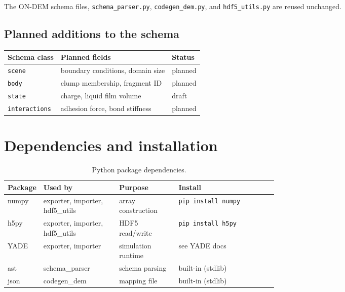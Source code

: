 \documentclass[11pt,a4paper]{article}
\begin{document}
The ON-DEM schema files, \texttt{schema\_parser.py}, \texttt{codegen\_dem.py},
and \texttt{hdf5\_utils.py} are reused unchanged.

\subsection{Planned additions to the schema}

\begin{center}
\begin{tabular}{lll}
\toprule
\sffamily\textbf{Schema class} & \sffamily\textbf{Planned fields} & \sffamily\textbf{Status} \\
\midrule
\texttt{scene}        & boundary conditions, domain size   & planned \\
\texttt{body}         & clump membership, fragment ID       & planned \\
\texttt{state}        & charge, liquid film volume          & draft \\
\texttt{interactions} & adhesion force, bond stiffness      & planned \\
\bottomrule
\end{tabular}
\end{center}

\section{Dependencies and installation}
\label{sec:deps}

\begin{table}[htbp]
\centering
\begin{tabularx}{\textwidth}{>{\ttfamily\small}p{0.12\linewidth}>{\small}p{0.28\linewidth}>{\small}p{0.22\linewidth}>{\small\raggedright\arraybackslash}X}
\toprule
\sffamily\textbf{Package} & \sffamily\textbf{Used by} & \sffamily\textbf{Purpose} & \sffamily\textbf{Install} \\
\midrule
numpy  & exporter, importer, hdf5\_utils & array construction  & \texttt{pip install numpy} \\
h5py   & exporter, importer, hdf5\_utils & HDF5 read/write     & \texttt{pip install h5py} \\
\normalfont YADE & exporter, importer     & simulation runtime  & see YADE docs \\
ast    & schema\_parser                  & schema parsing      & built-in (stdlib) \\
json   & codegen\_dem                    & mapping file        & built-in (stdlib) \\
\bottomrule
\end{tabularx}
\caption{Python package dependencies.}
\end{table}
\end{document}
